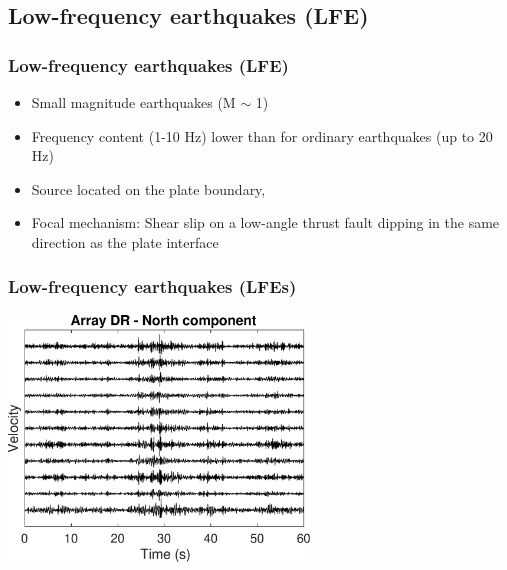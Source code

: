 \documentclass{beamer}
\begin{document}

	\subsection{Low-frequency earthquakes (LFE)}

	\begin{frame}
		\frametitle{Low-frequency earthquakes (LFE)}
		\begin{itemize}
			\item Small magnitude earthquakes (M $\sim$ 1)
			\item Frequency content (1-10 Hz) lower than for ordinary earthquakes (up to 20 Hz)
			\item Source located on the plate boundary,
			\item Focal mechanism: Shear slip on a low-angle thrust fault dipping in the same direction as the plate interface
		\end{itemize}
	\end{frame}

	\begin{frame}
		\frametitle{Low-frequency earthquakes (LFEs)}
		\begin{center}
			\includegraphics[trim={0cm 0cm 0cm 0cm}, clip, width=8cm]{ETS/LFE_NS.eps}
		\end{center}
	\end{frame}

\end{document}
